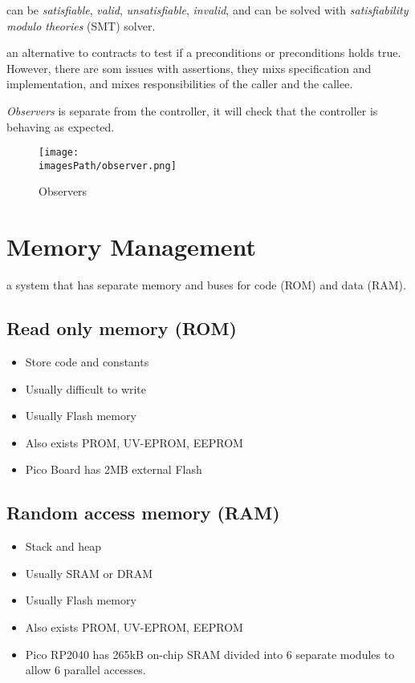  can be \textit{satisfiable}, \textit{valid}, \textit{ unsatisfiable}, \textit{invalid},
and can be solved with \textit{satisfiability modulo theories} (SMT) solver.

 an alternative to contracts to test if a preconditions or preconditions holds true.
However, there are som issues with assertions, they mixs specification and implementation, and mixes responsibilities of the caller and the callee.

\textit{Observers} is separate from the controller, it will check that the controller is behaving as expected.
\begin{figure}[H]
    \centering
    \texttt{[image: \\imagesPath/observer.png]}
    \caption{Observers}
    \label{fig:observer}
\end{figure}


\section{Memory Management}
 a system that has separate memory and 
buses for code (ROM) and data (RAM).

\subsection{Read only memory (ROM)}
\begin{itemize}
    \item Store code and constants
    \item Usually difficult to write
    \item Usually Flash memory 
    \item Also exists PROM, UV-EPROM, EEPROM
    \item Pico Board has 2MB external Flash
\end{itemize}

\subsection{Random access memory (RAM)}
\begin{itemize}
    \item Stack and heap
    \item Usually SRAM or DRAM
    \item Usually Flash memory 
    \item Also exists PROM, UV-EPROM, EEPROM
    \item Pico RP2040 has 265kB on-chip SRAM divided into 6 separate modules to allow 
    6 parallel accesses.
\end{itemize}

